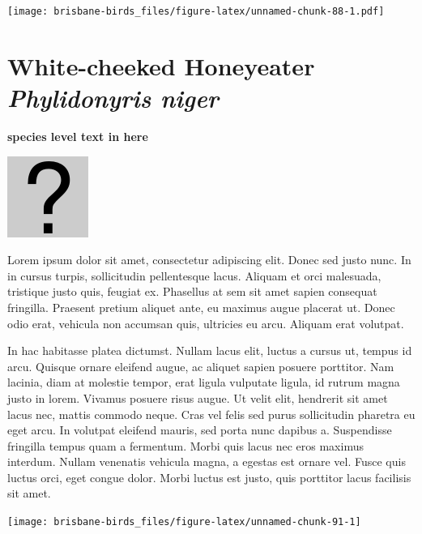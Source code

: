 \documentclass[]{book}
\let\origfigure\figure
\let\endorigfigure\endfigure
\renewenvironment{figure}[1][2] {
  \expandafter\origfigure\expandafter[H]
} {
  \endorigfigure
}
\begin{document}
\begin{figure}
\centering
\texttt{[image: brisbane-birds\_files/figure-latex/unnamed-chunk-88-1.pdf]}
\caption{\label{fig:unnamed-chunk-88}insert figure caption}
\end{figure}

\section{\texorpdfstring{White-cheeked Honeyeater \emph{Phylidonyris
niger}}{White-cheeked Honeyeater Phylidonyris niger}}\label{white-cheeked-honeyeater-phylidonyris-niger}

\textbf{species level text in here}

\begin{figure}
\centering
\includegraphics{assets/missing.png}
\caption{No image for species}
\end{figure}

Lorem ipsum dolor sit amet, consectetur adipiscing elit. Donec sed justo
nunc. In in cursus turpis, sollicitudin pellentesque lacus. Aliquam et
orci malesuada, tristique justo quis, feugiat ex. Phasellus at sem sit
amet sapien consequat fringilla. Praesent pretium aliquet ante, eu
maximus augue placerat ut. Donec odio erat, vehicula non accumsan quis,
ultricies eu arcu. Aliquam erat volutpat.

In hac habitasse platea dictumst. Nullam lacus elit, luctus a cursus ut,
tempus id arcu. Quisque ornare eleifend augue, ac aliquet sapien posuere
porttitor. Nam lacinia, diam at molestie tempor, erat ligula vulputate
ligula, id rutrum magna justo in lorem. Vivamus posuere risus augue. Ut
velit elit, hendrerit sit amet lacus nec, mattis commodo neque. Cras vel
felis sed purus sollicitudin pharetra eu eget arcu. In volutpat eleifend
mauris, sed porta nunc dapibus a. Suspendisse fringilla tempus quam a
fermentum. Morbi quis lacus nec eros maximus interdum. Nullam venenatis
vehicula magna, a egestas est ornare vel. Fusce quis luctus orci, eget
congue dolor. Morbi luctus est justo, quis porttitor lacus facilisis sit
amet.

\begin{figure}
\texttt{[image: brisbane-birds\_files/figure-latex/unnamed-chunk-91-1]} \caption{insert figure caption}\label{fig:unnamed-chunk-91}
\end{figure}
\end{document}
